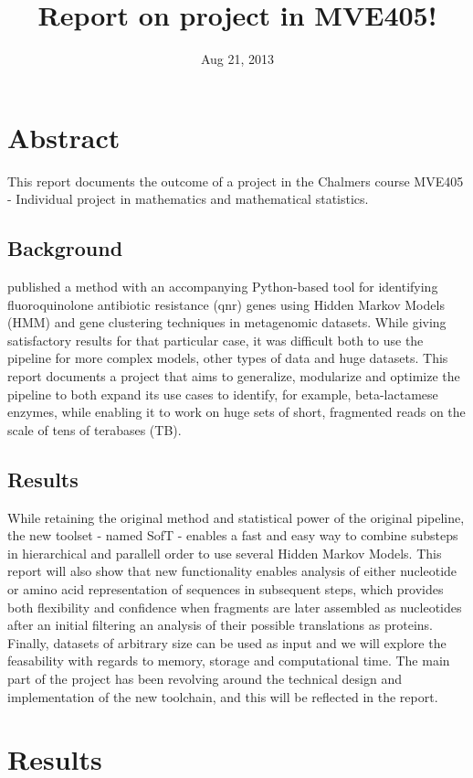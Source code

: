 \documentclass[a4paper,12pt]{article}
\title {Report on project in MVE405!}
\date {Aug 21, 2013}
\begin{document}
\maketitle

\section{Abstract}
This report documents the outcome of a project in the Chalmers course MVE405 - Individual project in mathematics and mathematical statistics.

\subsection{Background}
\textcite{Boulund} published a method with an accompanying Python-based tool for identifying fluoroquinolone antibiotic resistance (qnr) genes using Hidden Markov Models (HMM) and gene clustering techniques in metagenomic datasets. While giving satisfactory results for that particular case, it was difficult both to use the pipeline for more complex models, other types of data and huge datasets. This report documents a project that aims to generalize, modularize and optimize the pipeline to both expand its use cases to identify, for example, beta-lactamese enzymes, while enabling it to work on huge sets of short, fragmented reads on the scale of tens of terabases (TB).

\subsection{Results}
While retaining the original method and statistical power of the original pipeline, the new toolset - named SofT - enables a fast and easy way to combine substeps in hierarchical and parallell order to use several Hidden Markov Models. This report will also show that new functionality enables analysis of either nucleotide or amino acid representation of sequences in subsequent steps, which provides both flexibility and confidence when fragments are later assembled as nucleotides after an initial filtering an analysis of their possible translations as proteins. Finally, datasets of arbitrary size can be used as input and we will explore the feasability with regards to memory, storage and computational time. The main part of the project has been revolving around the technical design and implementation of the new toolchain, and this will be reflected in the report.

\section{Results}
\end{document}
